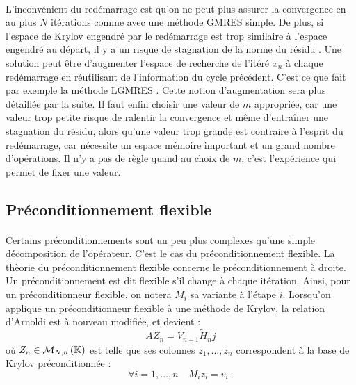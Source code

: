     \paragraph{}
    L’inconvénient du redémarrage est qu’on ne peut plus assurer la convergence en au plus $N$ itérations comme avec une méthode GMRES simple.
    De plus, si l'espace de Krylov engendré par le redémarrage est trop similaire à l'espace engendré au départ, il y a un risque de stagnation de la norme du résidu \cite{Simoncini1999}.
    Une solution peut être d'augmenter l'espace de recherche de l'itéré $x_n$ à chaque redémarrage en réutilisant de l'information du cycle précédent.
    C'est ce que fait par exemple la méthode LGMRES \cite{BakerJessupManteuffel2005}.
    Cette notion d'augmentation sera plus détaillée par la suite.
    Il faut enfin choisir une valeur de $m$ appropriée, car une valeur trop petite risque de ralentir la convergence et même d’entraîner une stagnation du résidu, alors qu'une valeur trop grande est contraire à l’esprit du redémarrage, car nécessite un espace mémoire important et un grand nombre d’opérations.
    Il n’y a pas de règle quand au choix de $m$, c’est l’expérience qui permet de fixer une valeur.


	\subsection{Préconditionnement flexible}

		\paragraph{}
		Certains préconditionnements sont un peu plus complexes qu'une simple décomposition de l'opérateur.
		C'est le cas du préconditionnement flexible.
    La thèorie du préconditionnement flexible concerne le préconditionnement à droite.
		Un préconditionnement est dit flexible s'il change à chaque itération.
    Ainsi, pour un préconditionneur flexible, on notera $M_i$ sa variante à l'étape $i$.
    Lorsqu'on applique un préconditionneur flexible à une méthode de Krylov, la relation d'Arnoldi est à nouveau modifiée, et devient :
    \begin{equation}\label{eq:arnoldi_pre_flex}
      AZ_n = V_{n+1}\widetilde{H}_nj
    \end{equation}
    où $Z_n\in\mathcal{M}_{N, n}\left(\mathbb{K}\right)$ est telle que ses colonnes $z_1,\dots, z_n$ correspondent à la base de Krylov préconditionnée :
    \[\forall i = 1, \dots, n\quad M_iz_i = v_i\ .\]

